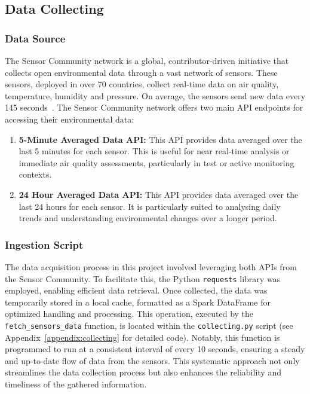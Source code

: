 \documentclass[12pt,oneside]{book} %
\begin{document}
\subsection{Data Collecting}
\subsubsection{Data Source}
The Sensor Community network is a global, contributor-driven initiative that
collects open environmental data through a vast network of sensors. These
sensors, deployed in over 70 countries, collect real-time data on air quality,
temperature, humidity and pressure. On average, the sensors send new data every
145 seconds~\cite{sensorcommunity2023synchronization}. The Sensor Community
network offers two main API endpoints for accessing their environmental data:

\begin{enumerate}
    \item \textbf{5-Minute Averaged Data API:} This API provides data averaged over the last 5 minutes for each sensor. This is useful for near real-time analysis or immediate air quality assessments, particularly in test or active monitoring contexts.
    \item \textbf{24 Hour Averaged Data API:} This API provides data averaged over the last 24 hours for each sensor. It is particularly suited to analysing daily trends and understanding environmental changes over a longer period.
\end{enumerate}

\subsubsection{Ingestion Script}
The data acquisition process in this project involved leveraging both APIs from
the Sensor Community. To facilitate this, the Python \texttt{requests} library
was employed, enabling efficient data retrieval. Once collected, the data was
temporarily stored in a local cache, formatted as a Spark DataFrame for
optimized handling and processing. This operation, executed by the
\texttt{fetch\_sensors\_data} function, is located within the
\texttt{collecting.py} script (see Appendix~\ref{appendix:collecting} for
detailed code). Notably, this function is programmed to run at a consistent
interval of every 10 seconds, ensuring a steady and up-to-date flow of data
from the sensors. This systematic approach not only streamlines the data
collection process but also enhances the reliability and timeliness of the
gathered information.
\end{document}
